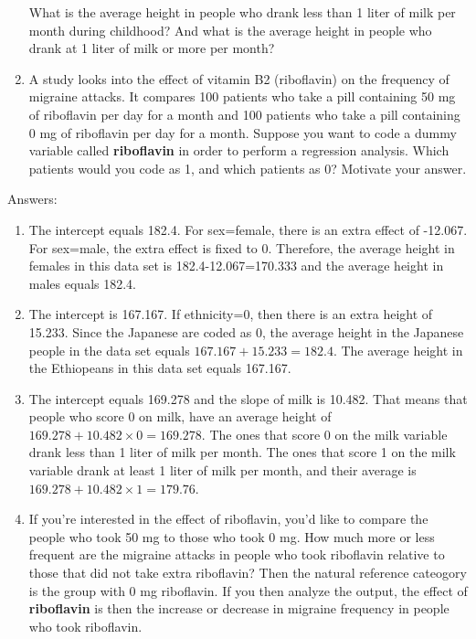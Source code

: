 \documentclass[]{report}\usepackage[]{graphicx}\usepackage[]{color}
\begin{document}
\begin{enumerate}
What is the average height in people who drank less than 1 liter of milk per month during childhood? And what is the average height in people who drank at 1 liter of milk or more per month?


\item A study looks into the effect of vitamin B2 (riboflavin) on the frequency of migraine attacks. It compares 100 patients who take a pill containing 50 mg of riboflavin per day for a month and 100 patients who take a pill containing 0 mg of riboflavin per day for a month. Suppose you want to code a dummy variable called \textbf{riboflavin} in order to perform a regression analysis. Which patients would you code as 1, and which patients as 0? Motivate your answer. 

\end{enumerate}

Answers:

\begin{enumerate}
\item The intercept equals 182.4. For sex=female, there is an extra effect of -12.067. For sex=male, the extra effect is fixed to 0. Therefore, the average height in females in this data set is 182.4-12.067=170.333 and the average height in males equals 182.4. 

\item 
The intercept is 167.167. If ethnicity=0, then there is an extra height of 15.233. Since the 
Japanese are coded as 0, the average height in the Japanese people in the data set equals $167.167+15.233= 182.4$. The average height in the Ethiopeans in this data set equals 167.167. 

\item The intercept equals 169.278 and the slope of milk is 10.482. That means that people who score 0 on milk, have an average height of $169.278 + 10.482 \times 0 = 169.278$. The ones that score 0 on the milk variable drank less than 1 liter of milk per month. The ones that score 1 on the milk variable drank at least 1 liter of milk per month, and their average is $169.278 + 10.482 \times 1 = 179.76$.

\item If you're interested in the effect of riboflavin, you'd like to compare the people who took 50 mg to those who took 0 mg. How much more or less frequent are the migraine attacks in people who took riboflavin relative to those that did not take extra riboflavin? Then the natural reference cateogory is the group with 0 mg riboflavin. If you then analyze the output, the effect of \textbf{riboflavin} is then the increase or decrease in migraine frequency in people who took riboflavin. 

\end{enumerate}
\end{document}
